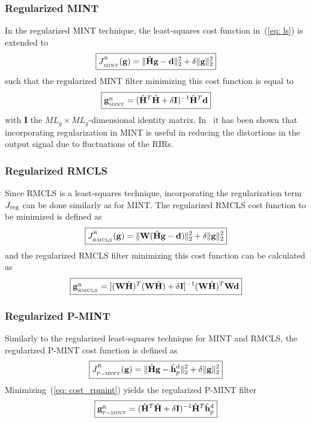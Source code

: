 \documentclass[10pt]{IEEEtran}
\begin{document}
\subsubsection*{Regularized MINT~\cite{Hikichi_EURASIP_2007}}
In the regularized MINT technique, the least-squares cost function in~(\ref{eq: ls}) is extended to
\begin{equation}
\label{eq: cost_rmint}
\boxed{J_{{}_{\rm MINT}}^{^{_{\rm R}}}(\mathbf{g}) = \|\hat{\mathbf{H}}\mathbf{g} - \mathbf{d}\|_2^2 + \delta \|\mathbf{g} \|_2^2}
\end{equation}
such that the regularized MINT filter minimizing this cost function is equal to
\begin{equation}
\label{eq: rmint_sgol}
\boxed{\mathbf{g}_{{}_{\rm MINT}}^{{_{\rm R}}}  = (\hat{\mathbf{H}}^T\hat{\mathbf{H}}+\delta \mathbf{I})^{-1}\hat{\mathbf{H}}^{T}\mathbf{d}}
\end{equation}
with $\mathbf{I}$ the $ML_g\times ML_g$-dimensional identity matrix.
In~\cite{Hikichi_EURASIP_2007} it has been shown that incorporating regularization in MINT is useful in reducing the distortions in the output signal due to fluctuations of the RIRs.


\subsubsection*{Regularized RMCLS}
Since RMCLS is a least-squares technique, incorporating the regularization term $J_{\rm reg}$ can be done similarly as for MINT.
The regularized RMCLS cost function to be minimized is defined as
\begin{equation}
\label{eq: cost_rrmcls}
\boxed{J_{{}_{\rm RMCLS}}^{^{_{\rm R}}}(\mathbf{g}) =  \|\mathbf{W}({\hat{\mathbf{H}}}\mathbf{g} - \mathbf{d})\|_2^2 + \delta \|\mathbf{g} \|_2^2}
\end{equation}
and the regularized RMCLS filter minimizing this cost function can be calculated as
\begin{equation}
\boxed{\mathbf{g}_{{}_{\rm RMCLS}}^{{_{\rm R}}}  = [(\mathbf{W}\hat{\mathbf{H}})^T(\mathbf{W}\hat{\mathbf{H}}) + \delta \mathbf{I}]^{-1} (\mathbf{W}\hat{\mathbf{H}})^T \mathbf{W}\mathbf{d}}
\end{equation}

\subsubsection*{Regularized P-MINT}
Similarly to the regularized least-squares technique for MINT and RMCLS, the regularized P-MINT cost function is defined as
\begin{equation}
\label{eq: cost_rpmint}
\boxed{J_{{}_{\rm P-MINT}} ^{^{_{\rm R}}}(\mathbf{g}) = \|\hat{\mathbf{H}}\mathbf{g} - \hat{\mathbf{h}}_p^{\rm d}\|_2^2 + \delta \|\mathbf{g} \|_2^2}
\end{equation}
Minimizing~(\ref{eq: cost_rpmint}) yields the regularized P-MINT filter
\begin{equation}
\label{eq: rpmintsol}
\boxed{\mathbf{g}_{{}_{\rm P-MINT}}^{{_{\rm R}}}  = (\hat{\mathbf{H}}^T\hat{\mathbf{H}}+\delta \mathbf{I})^{-1}\hat{\mathbf{H}}^{T}\hat{\mathbf{h}}_p^{\rm d}}
\end{equation}
\end{document}
